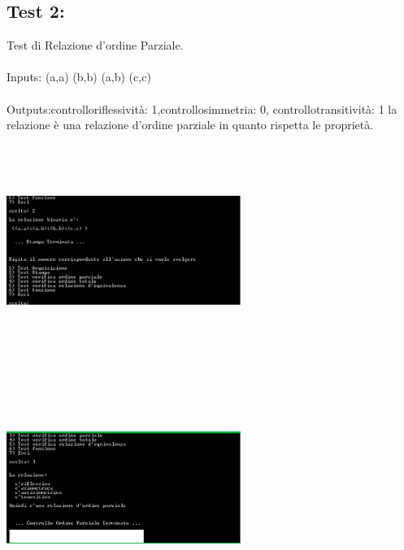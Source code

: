 \documentclass[11pt, a4paper, titlepage, block]{article}
\begin{document}
	\subsection{Test 2:}
	Test di Relazione d'ordine Parziale.\\
	\\
	Inputs: (a,a)  (b,b)  (a,b)  (c,c) \\
	\\
	Outputs:controlloriflessivit\`a:  1,controllosimmetria:  0, controllotransitivit\`a:  1
	la relazione \`e una relazione d'ordine parziale in quanto rispetta le propriet\`a.\\
	\includegraphics[width=3in,height=3in,viewport=0 0 300 300]{../Screenshots/Test2Input.png}
	\\
	\includegraphics[width=3in,height=3in,viewport=0 0 300 300]{../Screenshots/Test2Output.png}
	\\
	\\
	\newpage
\end{document}

